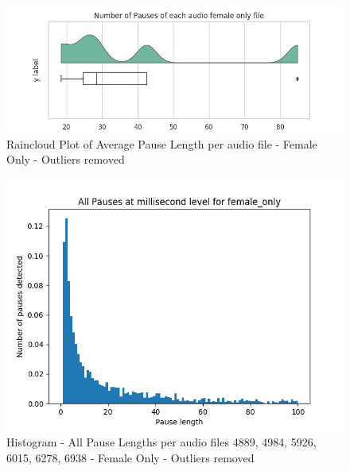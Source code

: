 \begin{figure}[h!]
	\begin{center}
		\includegraphics[scale=0.7]{src/main-matter/results/experiment-sex/pause-analysis/raincloud_pause_groups_num_female}
		\caption{Raincloud Plot of Average Pause Length per audio file - Female Only - Outliers removed}
		\label{default}
	\end{center}
\end{figure}
\begin{figure}[h!]
	\begin{center}
		\includegraphics[scale=0.7]{src/main-matter/results/experiment-sex/pause-analysis/pause_histogram_bin100_consolidatedfemale}
		\caption{Histogram - All Pause Lengths per audio files 4889, 4984, 5926, 6015, 6278, 6938 - Female Only - Outliers removed}
		\label{default}
	\end{center}
\end{figure}
